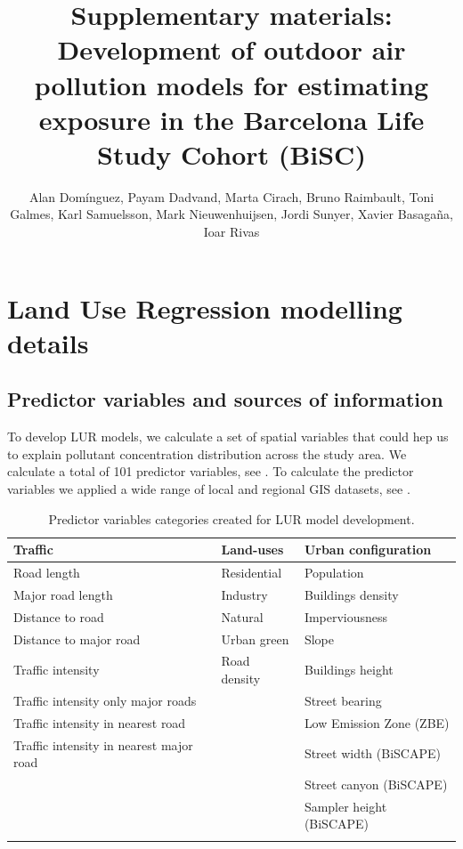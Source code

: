 \documentclass{article}
\title{\textbf{Supplementary materials: Development of outdoor air pollution models for estimating exposure in the Barcelona Life Study Cohort (BiSC)}}
\author{Alan Domínguez, Payam Dadvand, Marta Cirach, Bruno Raimbault, Toni Galmes, Karl Samuelsson, Mark Nieuwenhuijsen, Jordi Sunyer, Xavier Basagaña, Ioar Rivas}
\begin{document}
\maketitle

\section{Land Use Regression modelling details}

\subsection{Predictor variables and sources of information}
To develop LUR models, we calculate a set of spatial variables that could hep us to explain pollutant concentration distribution across the study area. We calculate a total of 101 predictor variables, see \textbf{}. To calculate the predictor variables we applied a wide range of local and regional GIS datasets, see \textbf{}. 


\renewcommand{\thetable}{S\arabic{table}}
\begin{table}[ht]
\centering
\caption{Predictor variables categories created for LUR model development.}
\begin{tabular}{lll}
\toprule
\textbf{Traffic} & \textbf{Land-uses} & \textbf{Urban configuration} \\
\midrule
Road length & Residential & Population \\
Major road length & Industry & Buildings density \\
Distance to road & Natural & Imperviousness \\
Distance to major road & Urban green & Slope \\
Traffic intensity & Road density & Buildings height \\
Traffic intensity only major roads &  & Street bearing \\
Traffic intensity in nearest road &  & Low Emission Zone (ZBE)\\
Traffic intensity in nearest major road &  & Street width (BiSCAPE)\\
                                         &  & Street canyon (BiSCAPE)\\
                                         &  & Sampler height (BiSCAPE)\\
\bottomrule
\label{Table S1}
\end{tabular}
\end{table}
\end{document}
